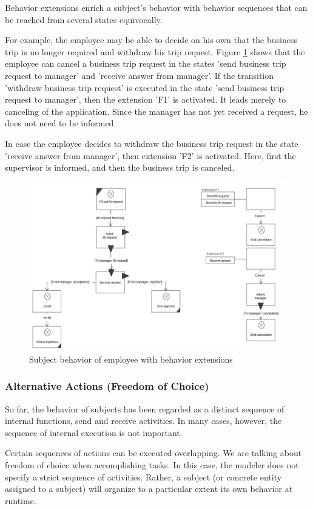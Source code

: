 Behavior extensions enrich a subject's behavior with behavior sequences that can be reached from several states equivocally.

For example, the employee may be able to decide on his own that the business trip is no longer required and withdraw his trip request. Figure \ref{fig:extension} shows that the employee can cancel a business trip request in the states 'send business trip request to manager' and 'receive answer from manager'. If the transition 'withdraw business trip request' is executed in the state 'send business trip request to manager', then the extension 'F1' is activated. It leads merely to canceling of the application. Since the manager has not yet received a request, he does not need to be informed.

In case the employee decides to withdraw the business trip request in the state 'receive answer from manager', then extension 'F2' is activated. Here, first the supervisor is informed, and then the business trip is canceled.

\begin{figure}[htbp]
	\centering
	\includegraphics[width=0.7\linewidth]{Figures/Ontology/SubjectExecution/Extension}
	\caption[Subject behavior of employee with behavior extensions]{Subject behavior of employee with behavior extensions}
	\label{fig:extension}
\end{figure}

\subsubsection{Alternative Actions (Freedom of Choice)} 

So far, the behavior of subjects has been regarded as a distinct sequence of internal functions, send and receive activities. In many cases, however, the sequence of internal execution is not important.

Certain sequences of actions can be executed overlapping. We are talking about freedom of choice when accomplishing tasks. In this case, the modeler does not specify a strict sequence of activities. Rather, a subject (or concrete entity assigned to a subject) will organize to a particular extent its own behavior at runtime.

